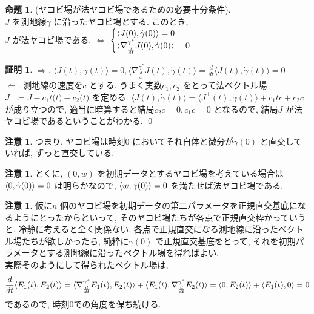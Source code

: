 \documentclass[twocolumn, landscape, a4paper , 8pt, fleqn, titlepage ]{jsarticle}
\theoremstyle{definition}
\newtheorem{prop}[dfn]{命題}
\newtheorem*{pf*}{証明}
\newtheorem{remark}[dfn]{注意}
\newcommand{\tbra}[1]{\mleft\langle#1\mright\rangle}
\newcommand{\ntbra}[1]{\langle#1\rangle}
\newcommand{\LR}{\Leftrightarrow}
\newcommand{\naraba}{\Rightarrow}
\newcommand{\gyaku}{\Leftarrow}
\renewcommand{\-}{\hyphen}
\begin{document}
\begin{prop}(ヤコビ場が法ヤコビ場であるための必要十分条件).\\
$J$ を測地線$\gamma$ に沿ったヤコビ場とする. このとき, \\
$J$ が法ヤコビ場である. $\LR$ $\begin{cases} \tbra{J(0), \dot \gamma(0)} = 0 \\ \ntbra{\nabla^{\gamma ^* } _{\frac{d}{dt}} J(0), \dot \gamma (0) } = 0 \end {cases} $

\end{prop}
\begin{pf*}
$\naraba.$ $\ntbra{J(t), \dot \gamma (t) } = 0, \ntbra{\nabla^{\gamma ^* } _{\frac{d}{dt}} J(t), \dot \gamma(t) } = \frac{d}{dt} \ntbra{J(t), \dot \gamma (t) } = 0$ \\
$\gyaku.$ 測地線の速度を$c$ とする. うまく実数$c_1, c_2$ をとって法ベクトル場 $J^\perp \coloneqq J - c_1 t \dot (t) - c_2 \dot (t)$ を定める. 
$\ntbra{J(t), \dot \gamma (t)} = \ntbra{J ^\perp (t) , \dot \gamma (t)  } + c_1 t c + c_2 c $ が成り立つので, 適当に暗算すると結局$c_2 c = 0, c_1 c = 0$ となるので, 結局$J$ が法ヤコビ場であるということがわかる. 
\qed
\end{pf*}

\begin{remark}
つまり, ヤコビ場は時刻$0$ においてそれ自体と微分が$\dot \gamma (0)$ と直交していれば, ずっと直交している. 
\end{remark}

\begin{remark}
とくに, $(0, w)$ を初期データとするヤコビ場を考えている場合は $\tbra{0 , \dot \gamma (0) } = 0$ は明らかなので, $\tbra{w , \dot \gamma (0)} = 0$ を満たせば法ヤコビ場である.
\end{remark}

\begin{remark}
仮に$n$ 個のヤコビ場を初期データの第二パラメータを正規直交基底になるようにとったからといって, そのヤコビ場たちが各点で正規直交枠かっていうと, 冷静に考えると全く関係ない. 各点で正規直交になる測地線に沿ったベクトル場たちが欲しかったら, 純粋に$\gamma (0)$ で正規直交基底をとって, それを初期パラメータとする測地線に沿ったベクトル場を得ればよい. \\ 実際そのようにして得られたベクトル場は,
\begin{align*}\frac{d}{dt} \tbra{E_1 (t), E_2 (t) } = \ntbra{\nabla ^{\gamma ^* } _{\frac{d}{dt} } E_1 (t) , E_2 (t)  } + \ntbra{E_1 (t), \nabla ^{\gamma ^* } _{\frac{d}{dt} }  E_2 (t)} = \tbra{0, E_2 (t)} + \tbra{E_1(t), 0} = 0 \end{align*}
であるので, 時刻$0$での角度を保ち続ける.
\end{remark}
\end{document}

